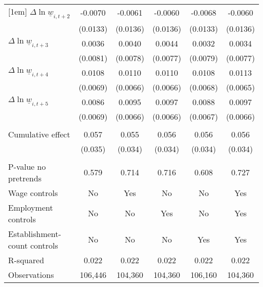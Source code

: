 {\begin{tabular}{l*{5}{c}}
[1em]
$\Delta \ln \underline{w}_{i,t+2}$&  -0.0070         &  -0.0061         &  -0.0060         &  -0.0068         &  -0.0060         \\
          & (0.0133)         & (0.0136)         & (0.0136)         & (0.0133)         & (0.0136)         \\
[1em]
$\Delta \ln \underline{w}_{i,t+3}$&   0.0036         &   0.0040         &   0.0044         &   0.0032         &   0.0034         \\
          & (0.0081)         & (0.0078)         & (0.0077)         & (0.0079)         & (0.0077)         \\
[1em]
$\Delta \ln \underline{w}_{i,t+4}$&   0.0108         &   0.0110         &   0.0110\sym{*}  &   0.0108         &   0.0113\sym{*}  \\
          & (0.0069)         & (0.0066)         & (0.0066)         & (0.0068)         & (0.0065)         \\
[1em]
$\Delta \ln \underline{w}_{i,t+5}$&   0.0086         &   0.0095         &   0.0097         &   0.0088         &   0.0097         \\
          & (0.0069)         & (0.0066)         & (0.0066)         & (0.0067)         & (0.0066)         \\
\hline
\vspace{-2mm}&                  &                  &                  &                  &                  \\
Cumulative effect&    0.057         &    0.055         &    0.056         &    0.056         &    0.056         \\
          &  (0.035)         &  (0.034)         &  (0.034)         &  (0.034)         &  (0.034)         \\
\hline    &                  &                  &                  &                  &                  \\
P-value no pretrends&    0.579         &    0.714         &    0.716         &    0.608         &    0.727         \\
Wage controls&       No         &      Yes         &       No         &       No         &      Yes         \\
Employment controls&       No         &       No         &      Yes         &       No         &      Yes         \\
Establishment-count controls&       No         &       No         &       No         &      Yes         &      Yes         \\
R-squared &    0.022         &    0.022         &    0.022         &    0.022         &    0.022         \\
Observations&  106,446         &  104,360         &  104,360         &  106,160         &  104,360         \\
\hline\hline
\end{tabular}
}
